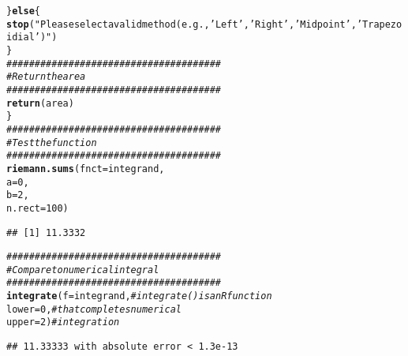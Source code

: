 \documentclass{article}\usepackage[]{graphicx}\usepackage[]{xcolor}
\makeatletter
\newcommand{\hlnum}[1]{\textcolor[rgb]{0.686,0.059,0.569}{#1}}%
\newcommand{\hlsng}[1]{\textcolor[rgb]{0.192,0.494,0.8}{#1}}%
\newcommand{\hlcom}[1]{\textcolor[rgb]{0.678,0.584,0.686}{\textit{#1}}}%
\newcommand{\hldef}[1]{\textcolor[rgb]{0.345,0.345,0.345}{#1}}%
\newcommand{\hlkwa}[1]{\textcolor[rgb]{0.161,0.373,0.58}{\textbf{#1}}}%
\newcommand{\hlkwc}[1]{\textcolor[rgb]{0.333,0.667,0.333}{#1}}%
\newcommand{\hlkwd}[1]{\textcolor[rgb]{0.737,0.353,0.396}{\textbf{#1}}}%
\newenvironment{kframe}{%
 \def\at@end@of@kframe{}%
 \ifinner\ifhmode%
  \def\at@end@of@kframe{\end{minipage}}%
  \begin{minipage}{\columnwidth}%
 \fi\fi%
 \def\FrameCommand##1{\hskip\@totalleftmargin \hskip-\fboxsep
 \colorbox{shadecolor}{##1}\hskip-\fboxsep
     \hskip-\linewidth \hskip-\@totalleftmargin \hskip\columnwidth}%
 \MakeFramed {\advance\hsize-\width
   \@totalleftmargin\z@ \linewidth\hsize
   \@setminipage}}%
 {\par\unskip\endMakeFramed%
 \at@end@of@kframe}
\newenvironment{knitrout}{}{} %
\makeatother
\begin{document}
\begin{enumerate}
\begin{enumerate}
\begin{knitrout}
\begin{kframe}
\begin{alltt}
  \hldef{\}}\hlkwa{else}\hldef{\{}
    \hlkwd{stop}\hldef{(}\hlsng{"Please select a valid method (e.g., 'Left', 'Right', 'Midpoint', 'Trapezoidial')"}\hldef{)}
  \hldef{\}}
  \hlcom{######################################}
  \hlcom{# Return the area}
  \hlcom{######################################}
  \hlkwd{return}\hldef{(area)}
\hldef{\}}
\hlcom{######################################}
\hlcom{# Test the function}
\hlcom{######################################}
\hlkwd{riemann.sums}\hldef{(}\hlkwc{fnct} \hldef{= integrand,}
             \hlkwc{a} \hldef{=} \hlnum{0}\hldef{,}
             \hlkwc{b} \hldef{=} \hlnum{2}\hldef{,}
             \hlkwc{n.rect} \hldef{=} \hlnum{100}\hldef{)}
\end{alltt}
\begin{verbatim}
## [1] 11.3332
\end{verbatim}
\begin{alltt}
\hlcom{######################################}
\hlcom{# Compare to numerical integral}
\hlcom{######################################}
\hlkwd{integrate}\hldef{(}\hlkwc{f} \hldef{= integrand,} \hlcom{# integrate() is an R function}
          \hlkwc{lower} \hldef{=} \hlnum{0}\hldef{,}     \hlcom{# that completes numerical}
          \hlkwc{upper} \hldef{=} \hlnum{2}\hldef{)}     \hlcom{# integration}
\end{alltt}
\begin{verbatim}
## 11.33333 with absolute error < 1.3e-13
\end{verbatim}
\end{kframe}
\end{knitrout}
\end{enumerate}
\end{enumerate}


\end{document}
